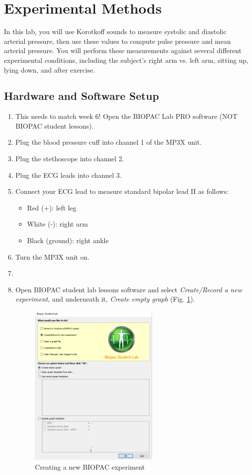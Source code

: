 \documentclass{article}
\begin{document}
\section*{Experimental Methods}
In this lab, you will use Korotkoff sounds to measure systolic and diastolic arterial pressure, then use these values to compute pulse pressure and mean arterial pressure. You will perform these measurements against several different experimental conditions, including the subject's right arm vs. left arm, sitting up, lying down, and after exercise.

\subsection*{Hardware and Software Setup}
\begin{enumerate}
	\item 
	This needs to match week 6!
	Open the BIOPAC Lab PRO software (NOT BIOPAC student lessons).
	
	
	
	
	\item Plug the blood pressure cuff into channel 1 of the MP3X unit.
	\item Plug the stethoscope into channel 2.
	\item Plug the ECG leads into channel 3.
	\item Connect your ECG lead to measure standard bipolar lead II as follows:\begin{itemize}
		\item Red (+): left leg
		\item White (-): right arm
		\item Black (ground): right ankle
	\end{itemize}
	\item Turn the MP3X unit on.
	\item \item Open BIOPAC student lab lessons software and select \textit{Create/Record a new experiment}, and underneath it, \textit{Create empty graph} (Fig. \ref{menu}).
		\begin{figure}[h]
	\centering\includegraphics[width=0.6\textwidth]{../images/ECG_II_9.png}
		\caption{Creating a new BIOPAC experiment}
		\label{menu}
		\end{figure}


\end{enumerate}
\end{document}
